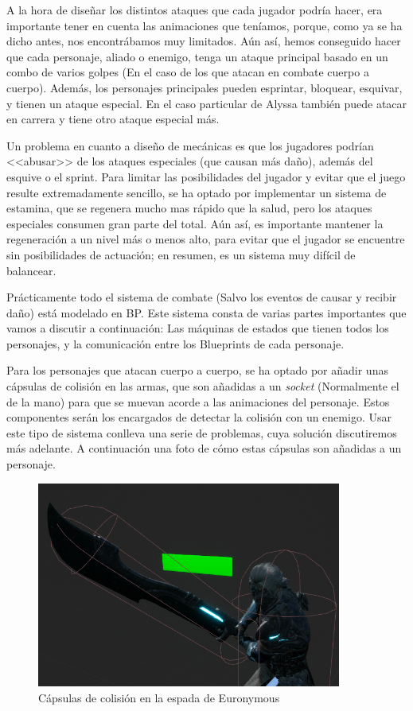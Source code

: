 A la hora de diseñar los distintos ataques que cada jugador podría hacer, era importante tener en cuenta las animaciones que teníamos, porque, como ya se ha dicho antes, nos encontrábamos muy limitados. Aún así, hemos conseguido hacer que cada personaje, aliado o enemigo, tenga un ataque principal basado en un combo de varios golpes (En el caso de los que atacan en combate cuerpo a cuerpo). Además, los personajes principales pueden esprintar, bloquear, esquivar, y tienen un ataque especial.
En el caso particular de Alyssa también puede atacar en carrera y tiene otro ataque especial más. 


Un problema en cuanto a diseño de mecánicas es que los jugadores podrían <<abusar>> de los ataques especiales (que causan más daño), además del esquive o el sprint. Para limitar las posibilidades del jugador y evitar que el juego resulte extremadamente sencillo, se ha optado por implementar un sistema de estamina, que se regenera mucho mas rápido que la salud, pero los ataques especiales consumen gran parte del total. Aún así, es importante mantener la regeneración a un nivel más o menos alto, para evitar que el jugador se encuentre sin posibilidades de actuación; en resumen, es un sistema muy difícil de balancear. 


Prácticamente todo el sistema de combate (Salvo los eventos de causar y recibir daño) está modelado en \ac{BP}. Este sistema consta de varias partes importantes que vamos a discutir a continuación: Las máquinas de estados que tienen todos los personajes, y la comunicación entre los Blueprints de cada personaje.


Para los personajes que atacan cuerpo a cuerpo, se ha optado por añadir unas cápsulas de colisión en las armas, que son añadidas a un \textit{socket} (Normalmente el de la mano) para que se muevan acorde a las animaciones del personaje. Estos componentes serán los encargados de detectar la colisión con un enemigo. Usar este tipo de sistema conlleva una serie de problemas, cuya solución discutiremos más adelante. A continuación una foto de cómo estas cápsulas son añadidas a un personaje.


\begin{figure}[H]
  \centering
  \includegraphics[width=10cm]{./images/Eur_Weapon.png}
  \caption{Cápsulas de colisión en la espada de Euronymous}
  \label{HenkkaSM}
\end{figure}


